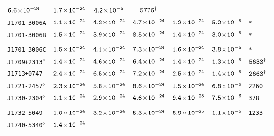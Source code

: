 \begin{longtable}{ l | c | c | c | c | c | l }
\scriptsize{$\tt{6.6\!\times\!10^{-24}}$} & \scriptsize{$\tt{1.7\!\times\!10^{-24}}$} & \scriptsize{$\tt{4.2\!\times\!10^{-5}}$} &
\scriptsize{$\tt{5776^{\dagger}}$} \\[-16pt] 
\scriptsize{\tt{J1701-3006A}} & \scriptsize{$\tt{1.1\!\times\!10^{-24}}$} & \scriptsize{$\tt{4.2\!\times\!10^{-24}}$} &
\scriptsize{$\tt{4.7\!\times\!10^{-24}}$} & \scriptsize{$\tt{1.2\!\times\!10^{-24}}$} & \scriptsize{$\tt{5.2\!\times\!10^{-5}}$} &
\scriptsize{\tt{*}} \\[-16pt] 
\scriptsize{\tt{J1701-3006B}} & \scriptsize{$\tt{1.5\!\times\!10^{-24}}$} & \scriptsize{$\tt{3.9\!\times\!10^{-24}}$} &
\scriptsize{$\tt{8.5\!\times\!10^{-24}}$} & \scriptsize{$\tt{1.4\!\times\!10^{-24}}$} & \scriptsize{$\tt{3.0\!\times\!10^{-5}}$} &
\scriptsize{\tt{*}} \\[-16pt] 
\\[-20pt] 
\scriptsize{\tt{J1701-3006C}} & \scriptsize{$\tt{1.5\!\times\!10^{-24}}$} & \scriptsize{$\tt{4.1\!\times\!10^{-24}}$} &
\scriptsize{$\tt{7.3\!\times\!10^{-24}}$} & \scriptsize{$\tt{1.6\!\times\!10^{-24}}$} & \scriptsize{$\tt{3.8\!\times\!10^{-5}}$} &
\scriptsize{\tt{*}} \\[-16pt] 
\scriptsize{\tt{J1709+2313}$^{\diamond}$} & \scriptsize{$\tt{1.4\!\times\!10^{-24}}$} &
\scriptsize{$\tt{4.6\!\times\!10^{-24}}$} & \scriptsize{$\tt{6.4\!\times\!10^{-24}}$} & \scriptsize{$\tt{1.4\!\times\!10^{-24}}$}
& \scriptsize{$\tt{1.3\!\times\!10^{-5}}$} & \scriptsize{$\tt{5633^{\dagger}}$} \\[-16pt] 
\scriptsize{\tt{J1713+0747}} & \scriptsize{$\tt{2.4\!\times\!10^{-24}}$} & \scriptsize{$\tt{6.5\!\times\!10^{-24}}$} &
\scriptsize{$\tt{7.2\!\times\!10^{-24}}$} & \scriptsize{$\tt{2.5\!\times\!10^{-24}}$} & \scriptsize{$\tt{1.4\!\times\!10^{-5}}$} &
\scriptsize{$\tt{2663^{\dagger}}$} \\[-16pt] 
\scriptsize{\tt{J1721-2457}$^{\diamond}$} & \scriptsize{$\tt{2.3\!\times\!10^{-24}}$} &
\scriptsize{$\tt{5.8\!\times\!10^{-24}}$} & \scriptsize{$\tt{8.6\!\times\!10^{-24}}$} &\scriptsize{$\tt{1.5\!\times\!10^{-24}}$} &
\scriptsize{$\tt{6.8\!\times\!10^{-6}}$} & \scriptsize{\tt{2260}} \\[-16pt] 
\scriptsize{\tt{J1730-2304}$^{\diamond}$} & \scriptsize{$\tt{1.1\!\times\!10^{-24}}$} &
\scriptsize{$\tt{2.9\!\times\!10^{-24}}$} & \scriptsize{$\tt{4.6\!\times\!10^{-24}}$} &\scriptsize{$\tt{9.4\!\times\!10^{-25}}$} &
\scriptsize{$\tt{7.5\!\times\!10^{-6}}$} & \scriptsize{\tt{378}} \\[-16pt] 
\\[-20pt] 
\scriptsize{\tt{J1732-5049}} & \scriptsize{$\tt{1.0\!\times\!10^{-24}}$} & \scriptsize{$\tt{3.2\!\times\!10^{-24}}$} &
\scriptsize{$\tt{5.3\!\times\!10^{-24}}$} &\scriptsize{$\tt{8.9\!\times\!10^{-25}}$} & \scriptsize{$\tt{1.1\!\times\!10^{-5}}$} &
\scriptsize{\tt{1233}} \\[-16pt] 
\scriptsize{\tt{J1740-5340}$^{\diamond}$} & \scriptsize{$\tt{1.4\!\times\!10^{-24}}$} &

\end{longtable}
